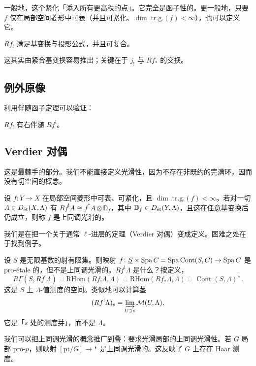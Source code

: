 一般地，这个紧化「添入所有更高秩的点」。它完全是函子性的。更一般地，只要 $f$ 仅在局部空间菱形中可表（并且可紧化、$\dim.\mathrm{tr.g.}(f)<\infty$），也可以定义它。

\begin{theorem}
$Rf_!$ 满足基变换与投影公式，并且可复合。
\end{theorem}

这其实由紧合基变换容易推出；关键在于 $j_!$ 与 $Rf_*$ 的交换。

\subsection{例外原像}

利用伴随函子定理可以验证：

\begin{proposition}
$Rf_!$ 有右伴随 $Rf^!$。
\end{proposition}

\subsection{Verdier 对偶}

这是最棘手的部分。我们不能直接定义光滑性，因为不存在非既约的完满环，因而没有切空间的概念。

\begin{definition}
设 $f\colon Y\to X$ 在局部空间菱形中可表、可紧化，且 $\dim.\mathrm{tr.g.}(f)<\infty$。若对一切 $A\in D_{\et}(X,\Lambda)$ 有 $Rf^!A\cong f^*A\otimes\mathbb{D}_f$，其中 $\mathbb{D}_f\in D_{\et}(Y,\Lambda)$，且这在任意基变换后仍成立，则称 $f$ 是上同调光滑的。
\end{definition}


我们是在把一个关于通常 $\ell$-进层的定理（Verdier 对偶）变成定义。困难之处在于找到例子。

\begin{example}
设 $S$ 是无限基数的射有限集。则映射 $f\colon\underline{S}\times\Spa C=\Spa\operatorname{Cont}(S,C)\to\Spa C$ 是 pro-étale 的，但不是上同调光滑的。$Rf^!\Lambda$ 是什么？按定义，
\[
R\Gamma(S,Rf^!\Lambda)=\mathrm{RHom}(Rf_!\Lambda,\Lambda)=\mathrm{RHom}(Rf_*\Lambda,\Lambda)=\operatorname{Cont}(S,\Lambda)^\vee.
\]
这是 $S$ 上 $\Lambda$-值测度的空间。类似地可以计算茎
\[
(Rf^!\Lambda)_s=\varinjlim_{U\ni s}\mathcal{M}(U,\Lambda),
\]
它是「$s$ 处的测度芽」，而不是 $\Lambda$。
\end{example}

\begin{example}
我们可以把上同调光滑的概念推广到叠：要求光滑局部的上同调光滑性。若 $G$ 局部 pro-$p$，则映射 $[\mathrm{pt}/G]\to *$ 是上同调光滑的。这反映了 $G$ 上存在 Haar 测度。
\end{example}
